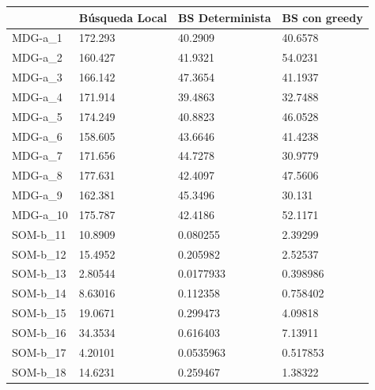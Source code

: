 \documentclass[11pt,a4paper]{article}
\begin{document}
	\begin{table}[H]
		\begin{tabular}{l|l|l|l|}
			\cline{2-4}
			& Búsqueda Local & BS Determinista & BS con greedy \\ \hline
			\multicolumn{1}{|l|}{MDG-a\_1}  & 172.293        & 40.2909         & 40.6578       \\ \hline
			\multicolumn{1}{|l|}{MDG-a\_2}  & 160.427        & 41.9321         & 54.0231       \\ \hline
			\multicolumn{1}{|l|}{MDG-a\_3}  & 166.142        & 47.3654         & 41.1937       \\ \hline
			\multicolumn{1}{|l|}{MDG-a\_4}  & 171.914        & 39.4863         & 32.7488       \\ \hline
			\multicolumn{1}{|l|}{MDG-a\_5}  & 174.249        & 40.8823         & 46.0528       \\ \hline
			\multicolumn{1}{|l|}{MDG-a\_6}  & 158.605        & 43.6646         & 41.4238       \\ \hline
			\multicolumn{1}{|l|}{MDG-a\_7}  & 171.656        & 44.7278         & 30.9779       \\ \hline
			\multicolumn{1}{|l|}{MDG-a\_8}  & 177.631        & 42.4097         & 47.5606       \\ \hline
			\multicolumn{1}{|l|}{MDG-a\_9}  & 162.381        & 45.3496         & 30.131        \\ \hline
			\multicolumn{1}{|l|}{MDG-a\_10} & 175.787        & 42.4186         & 52.1171       \\ \hline
			\multicolumn{1}{|l|}{SOM-b\_11} & 10.8909        & 0.080255        & 2.39299       \\ \hline
			\multicolumn{1}{|l|}{SOM-b\_12} & 15.4952        & 0.205982        & 2.52537       \\ \hline
			\multicolumn{1}{|l|}{SOM-b\_13} & 2.80544        & 0.0177933       & 0.398986      \\ \hline
			\multicolumn{1}{|l|}{SOM-b\_14} & 8.63016        & 0.112358        & 0.758402      \\ \hline
			\multicolumn{1}{|l|}{SOM-b\_15} & 19.0671        & 0.299473        & 4.09818       \\ \hline
			\multicolumn{1}{|l|}{SOM-b\_16} & 34.3534        & 0.616403        & 7.13911       \\ \hline
			\multicolumn{1}{|l|}{SOM-b\_17} & 4.20101        & 0.0535963       & 0.517853      \\ \hline
			\multicolumn{1}{|l|}{SOM-b\_18} & 14.6231        & 0.259467        & 1.38322       \\ \hline

\end{tabular}
\end{table}
\end{document}
